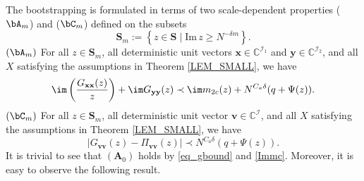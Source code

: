 The bootstrapping is formulated in terms of two scale-dependent properties ($\bA_m$) and ($\bC_m$) defined on the subsets
\[\mathbf S_m:=\left\{z\in\mathbf S\mid\text{Im} \, z\ge N^{-\delta m}\right\}.\]
${(\bA_m)}$ For all $z\in\mathbf S_m$, all deterministic unit vectors $\mathbf x \in \mathbb C^{\mathcal I_1}$ and $\mathbf y \in \mathbb C^{\mathcal I_2}$, and all $X$ satisfying the assumptions in Theorem \ref{LEM_SMALL}, we have
\begin{equation}\label{eq_comp_Am}
 \im \left(\frac{G_{\mathbf x\mathbf x}(z)}{z}\right) + \im G_{\mathbf y\mathbf y}(z)\prec \im m_{2c}(z) +N^{C_a\delta}(q+\Psi(z)).
\end{equation}
${(\bC_m)}$ For all $z\in\mathbf S_m$, all deterministic unit vector $\mathbf v\in \mathbb C^{\mathcal I}$, and all $X$ satisfying the assumptions in Theorem \ref{LEM_SMALL}, %
we have
\begin{equation}\label{eq_comp_Cm}
 \left|G_{\mathbf v\mathbf v}(z)-\Pi_{\mathbf v\mathbf v}(z)\right|\prec N^{C_a\delta}(q+\Psi(z)).
\end{equation}
It is trivial to see that ${(\mathbf A_0)}$ holds by \eqref{eq_gbound} and \eqref{Immc}. Moreover, it is easy to observe the following result.

